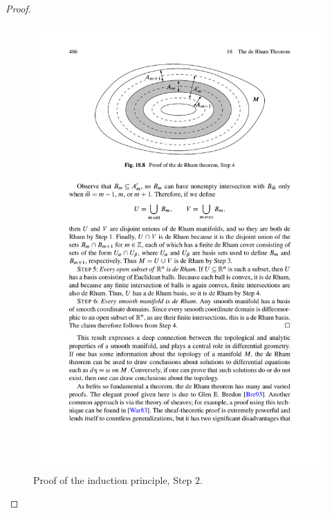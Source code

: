 \begin{proof}
\begin{figure}[htbp]
\includegraphics{pictures/induction-principle}
\caption{Proof of the induction principle, Step $2$.}
\end{figure}


\end{proof}
